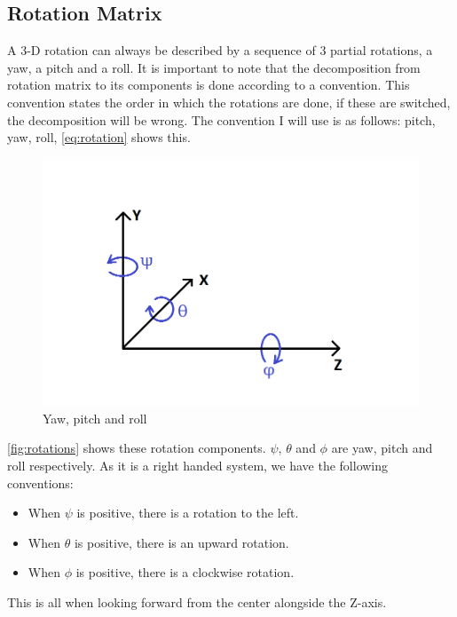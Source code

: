 \subsection{Rotation Matrix}\label{ssec:rotmat}
A 3-D rotation can always be described by a sequence of 3 partial rotations, a yaw, a pitch and a roll. It is important to note that the decomposition from rotation matrix to its components is done according to a convention. This convention states the order in which the rotations are done, if these are switched, the decomposition will be wrong. The convention I will use is as follows: pitch, yaw, roll, \autoref{eq:rotation} shows this.\bigskip
\begin{figure}
    \centering
    \includegraphics[width=1\textwidth]{figures/yaw_pitch_roll.png}
    \caption{Yaw, pitch and roll}
    \label{fig:rotations}
\end{figure}

\autoref{fig:rotations} shows these rotation components. $\psi$, $\theta$ and $\phi$ are yaw, pitch and roll respectively. As it is a right handed system, we have the following conventions:
\begin{itemize}
    \item When $\psi$ is positive, there is a rotation to the left.
    \item When $\theta$ is positive, there is an upward rotation.
    \item When $\phi$ is positive, there is a clockwise rotation.
\end{itemize}
This is all when looking forward from the center alongside the Z-axis.\bigskip


